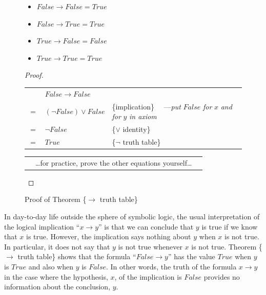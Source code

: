 \begin{figure}
\begin{theorem}
\mbox{}
\begin{itemize}
\item $False \rightarrow False = True$
\item $False \rightarrow True  = True$
\item $True  \rightarrow False = False$
\item $True  \rightarrow True  = True$
\end{itemize}
\end{theorem}

\begin{proof}
\mbox{} \\
\begin{tabular}{llp{3.15in}}
    & $False \rightarrow False$        & \\
$=$ & $(\neg False) \vee False$        & \{implication\} ~~---\emph{put} $False$ \emph{for} $x$ \emph{and for} $y$ \emph{in axiom}\\
$=$ & $\neg False$                     & \{$\vee$ identity\}\\
$=$ & $True$                           & \{$\neg$ truth table\}\\
\end{tabular}

\begin{tabular}{lll}
& \dots for practice, prove the other equations yourself\dots & \\
\end{tabular}

\end{proof}
\caption{Proof of Theorem \{$\rightarrow$ truth table\}}
\label{implication-truth-table}
\end{figure}

In day-to-day life outside the sphere of symbolic logic,
the usual interpretation of the logical implication ``$x \rightarrow y$''
is that we can conclude that $y$ is true if we know that
$x$ is true. However, the implication says nothing
about $y$ when $x$ is not true. In particular, it
does not say that $y$ is not true whenever $x$ is not true.
Theorem \{$\rightarrow$ truth table\} shows that the
formula ``$False \rightarrow y$'' has the value $True$ when $y$ is $True$
and also when $y$ is $False$.
In other words, the truth of the formula $x \rightarrow y$ in the case
where the hypothesis, $x$, of the implication is $False$ provides
no information about the conclusion, $y$.


